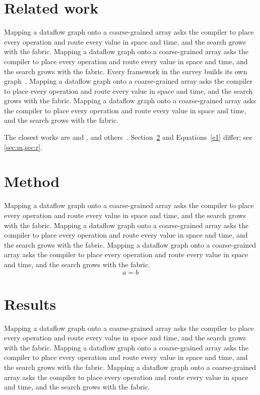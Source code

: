 \documentclass[twocolumn]{article}
\begin{document}
\section{Related work}
Mapping a dataflow graph onto a coarse-grained array asks the compiler to place every operation and route every value in space and time, and the search grows with the fabric. Mapping a dataflow graph onto a coarse-grained array asks the compiler to place every operation and route every value in space and time, and the search grows with the fabric. Every framework in the survey builds its own graph~\cite{k01,k02,k03,k04,k05,k06,k07,k08,k09,k10,k11,k12,k13,k14,k15,k16,k17,k18,k19,k20,k21,k22,k23,k24,k25,k26,k27,k28,k29,k30,k31,k32,k33,k34,k35,k36,k37,k38,k39,k40}. Mapping a dataflow graph onto a coarse-grained array asks the compiler to place every operation and route every value in space and time, and the search grows with the fabric. Mapping a dataflow graph onto a coarse-grained array asks the compiler to place every operation and route every value in space and time, and the search grows with the fabric.

The closest works are \citet{k41} and \citet{k42}, and others~\citep{k43,k44}. Section~\ref{sec:m} and Equations~\eqref{e1} differ; see \cref{sec:m,sec:r}.

\section{Method}\label{sec:m}
Mapping a dataflow graph onto a coarse-grained array asks the compiler to place every operation and route every value in space and time, and the search grows with the fabric. Mapping a dataflow graph onto a coarse-grained array asks the compiler to place every operation and route every value in space and time, and the search grows with the fabric. Mapping a dataflow graph onto a coarse-grained array asks the compiler to place every operation and route every value in space and time, and the search grows with the fabric.
\begin{equation}a=b\label{e1}\end{equation}
\section{Results}\label{sec:r}
Mapping a dataflow graph onto a coarse-grained array asks the compiler to place every operation and route every value in space and time, and the search grows with the fabric. Mapping a dataflow graph onto a coarse-grained array asks the compiler to place every operation and route every value in space and time, and the search grows with the fabric. Mapping a dataflow graph onto a coarse-grained array asks the compiler to place every operation and route every value in space and time, and the search grows with the fabric.
\end{document}
